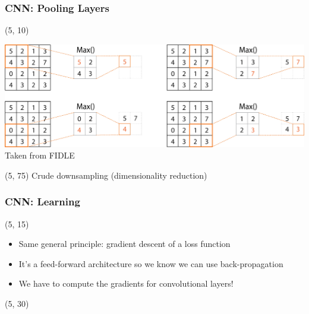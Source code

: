 \begin{frame}[label=Pooling_Layers]
  \frametitle{\acl{CNN}: Pooling Layers}

  \begin{textblock}{90}(5, 10)
    \begin{center}
      \includegraphics[width=\textwidth]{img/CNN_Pooling.png}
      Taken from FIDLE
    \end{center}
  \end{textblock}

  \begin{textblock}{45}(5, 75)
    Crude downsampling (dimensionality reduction)\\
  \end{textblock}
\end{frame}


\begin{frame}
  \frametitle{\acl{CNN}: Learning}

  \begin{textblock}{90}(5, 15)
    \begin{itemize}
    \item<1-> Same general principle: gradient descent of a loss function
    \item<2-> It's a feed-forward architecture so we know we can use back-propagation
    \item<3-> We have to compute the gradients for convolutional layers!
    \end{itemize}
  \end{textblock}

  \begin{textblock}{90}(5, 30)
  \end{textblock}
\end{frame}


